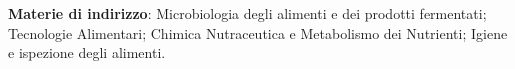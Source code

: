 \documentclass[10pt,a4paper]{altacv}
\begin{document}
\vspace{0.5em}

\textbf{Materie di indirizzo}: %
Microbiologia degli alimenti e dei prodotti fermentati; Tecnologie Alimentari; Chimica Nutraceutica e Metabolismo dei Nutrienti; Igiene e ispezione degli alimenti.




\end{document}
